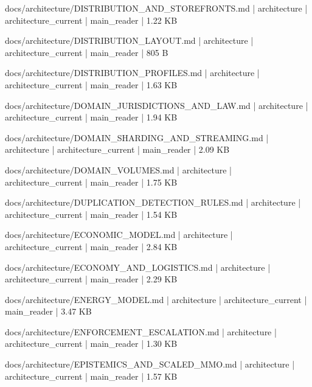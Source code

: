 \documentclass[11pt,a4paper]{report}
\begin{document}
{\small\ttfamily\raggedright docs/\allowbreak{}architecture/\allowbreak{}DISTRIBUTION\_AND\_STOREFRONTS.\allowbreak{}md | architecture | architecture\_current | main\_reader | 1.\allowbreak{}22 KB\par}
{\small\ttfamily\raggedright docs/\allowbreak{}architecture/\allowbreak{}DISTRIBUTION\_LAYOUT.\allowbreak{}md | architecture | architecture\_current | main\_reader | 805 B\par}
{\small\ttfamily\raggedright docs/\allowbreak{}architecture/\allowbreak{}DISTRIBUTION\_PROFILES.\allowbreak{}md | architecture | architecture\_current | main\_reader | 1.\allowbreak{}63 KB\par}
{\small\ttfamily\raggedright docs/\allowbreak{}architecture/\allowbreak{}DOMAIN\_JURISDICTIONS\_AND\_LAW.\allowbreak{}md | architecture | architecture\_current | main\_reader | 1.\allowbreak{}94 KB\par}
{\small\ttfamily\raggedright docs/\allowbreak{}architecture/\allowbreak{}DOMAIN\_SHARDING\_AND\_STREAMING.\allowbreak{}md | architecture | architecture\_current | main\_reader | 2.\allowbreak{}09 KB\par}
{\small\ttfamily\raggedright docs/\allowbreak{}architecture/\allowbreak{}DOMAIN\_VOLUMES.\allowbreak{}md | architecture | architecture\_current | main\_reader | 1.\allowbreak{}75 KB\par}
{\small\ttfamily\raggedright docs/\allowbreak{}architecture/\allowbreak{}DUPLICATION\_DETECTION\_RULES.\allowbreak{}md | architecture | architecture\_current | main\_reader | 1.\allowbreak{}54 KB\par}
{\small\ttfamily\raggedright docs/\allowbreak{}architecture/\allowbreak{}ECONOMIC\_MODEL.\allowbreak{}md | architecture | architecture\_current | main\_reader | 2.\allowbreak{}84 KB\par}
{\small\ttfamily\raggedright docs/\allowbreak{}architecture/\allowbreak{}ECONOMY\_AND\_LOGISTICS.\allowbreak{}md | architecture | architecture\_current | main\_reader | 2.\allowbreak{}29 KB\par}
{\small\ttfamily\raggedright docs/\allowbreak{}architecture/\allowbreak{}ENERGY\_MODEL.\allowbreak{}md | architecture | architecture\_current | main\_reader | 3.\allowbreak{}47 KB\par}
{\small\ttfamily\raggedright docs/\allowbreak{}architecture/\allowbreak{}ENFORCEMENT\_ESCALATION.\allowbreak{}md | architecture | architecture\_current | main\_reader | 1.\allowbreak{}30 KB\par}
{\small\ttfamily\raggedright docs/\allowbreak{}architecture/\allowbreak{}EPISTEMICS\_AND\_SCALED\_MMO.\allowbreak{}md | architecture | architecture\_current | main\_reader | 1.\allowbreak{}57 KB\par}
\end{document}
